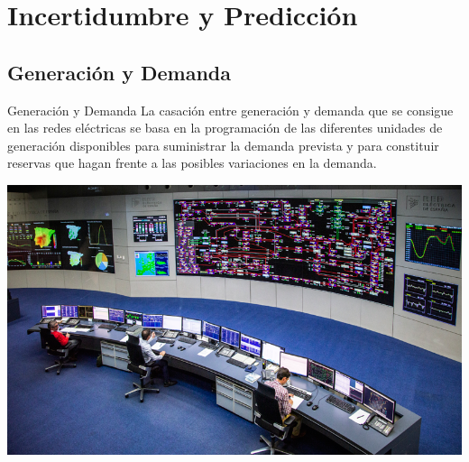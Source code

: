 \documentclass[aspectratio=169, usenames,svgnames,dvipsnames]{beamer}
\begin{document}
\section{Incertidumbre y Predicción}
\label{sec:org3117434}

\subsection{Generación y Demanda}
\label{sec:orgdc72f18}
\begin{frame}[label={sec:orgd0ffefd}]{Generación y Demanda}
La \alert{casación entre generación y demanda} que se consigue en las redes
eléctricas se basa en la \alert{programación} de las diferentes unidades de
\alert{generación} disponibles para suministrar la \alert{demanda prevista} y para
constituir \alert{reservas} que hagan frente a las posibles \alert{variaciones} en la
demanda.

\begin{center}
\includegraphics[height=0.65\textheight]{../figs/CentroOperacionesREE.png}
\end{center}
\end{frame}
\end{document}
